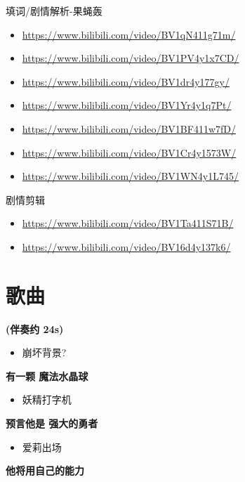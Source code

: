 \documentclass[a4paper]{article}
\begin{document}
填词/剧情解析-果蝇轰

\begin{itemize}
    \item \href{爱在西元前}{https://www.bilibili.com/video/BV1qN411g71m/}
    \item \href{手写的从前}{https://www.bilibili.com/video/BV1PV4y1x7CD/}
    \item \href{爱的第七章}{https://www.bilibili.com/video/BV1dr4y177gy/}
    \item \href{以爱之名}{https://www.bilibili.com/video/BV1Yr4y1q7Pt/}
    \item \href{我许下美丽的心愿, 其名为「爱莉希雅」}{https://www.bilibili.com/video/BV1BF411w7fD/}
    \item \href{于是……再见了，爱莉希雅}{https://www.bilibili.com/video/BV1Cr4y1573W/}
    \item \href{笑一笑，然后为爱莉、为三蹦子献上拥抱}{https://www.bilibili.com/video/BV1WN4y1L745/}
\end{itemize}

剧情剪辑

\begin{itemize}
    \item \href{终于知道凯文当时的语气为何如此悲伤了}{https://www.bilibili.com/video/BV1Ta411S71B/}
    \item \href{致最无暇之人}{https://www.bilibili.com/video/BV16d4y137k6/}
\end{itemize}

\section{歌曲}

\textbf{(伴奏约 24s)}

\begin{itemize}
    \item 崩坏背景?
\end{itemize}

\textbf{有一颗 魔法水晶球}

\begin{itemize}
    \item 妖精打字机
\end{itemize}

\textbf{预言他是 强大的勇者}

\begin{itemize}
    \item 爱莉出场
\end{itemize}

\textbf{他将用自己的能力}
\end{document}
